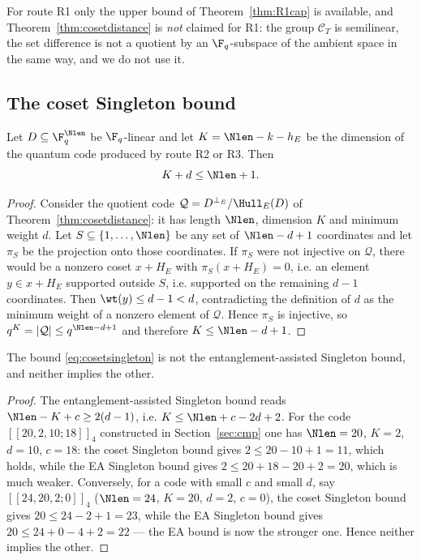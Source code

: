 \begin{remark}
For route R1 only the upper bound of Theorem~\ref{thm:R1cap} is available, and
Theorem~\ref{thm:cosetdistance} is \emph{not} claimed for R1: the group
$\mathcal C_T$ is semilinear, the set difference is not a quotient by an
$\F_q$-subspace of the ambient space in the same way, and we do not use it.
\end{remark}

\subsection{The coset Singleton bound}

\begin{theorem}\label{thm:cosetsingleton}
Let $D\subseteq\F_q^{\Nlen}$ be $\F_q$-linear and let $K=\Nlen-k-h_E$ be the
dimension of the quantum code produced by route R2 or R3. Then
\begin{equation}\label{eq:cosetsingleton}
  K+d\le \Nlen+1 .
\end{equation}
\end{theorem}

\begin{proof}
Consider the quotient code $\mathcal Q=D^{\perp_E}/\Hull_E(D)$ of
Theorem~\ref{thm:cosetdistance}: it has length $\Nlen$, dimension $K$ and
minimum weight $d$. Let $S\subseteq\{1,\dots,\Nlen\}$ be any set of
$\Nlen-d+1$ coordinates and let $\pi_S$ be the projection onto those
coordinates. If $\pi_S$ were not injective on $\mathcal Q$, there would be a
nonzero coset $x+H_E$ with $\pi_S(x+H_E)=0$, i.e. an element
$y\in x+H_E$ supported outside $S$, i.e. supported on the remaining
$d-1$ coordinates. Then $\wt(y)\le d-1<d$, contradicting the definition of $d$
as the minimum weight of a nonzero element of $\mathcal Q$. Hence $\pi_S$ is
injective, so $q^K=|\mathcal Q|\le q^{\Nlen-d+1}$ and therefore
$K\le\Nlen-d+1$.
\end{proof}

\begin{proposition}\label{prop:newsbound}
The bound \eqref{eq:cosetsingleton} is not the entanglement-assisted Singleton
bound, and neither implies the other.
\end{proposition}

\begin{proof}
The entanglement-assisted Singleton bound reads
$\Nlen-K+c\ge 2(d-1)$, i.e. $K\le\Nlen+c-2d+2$. For the code
$[[20,2,10;18]]_4$ constructed in Section~\ref{sec:cmp} one has $\Nlen=20$,
$K=2$, $d=10$, $c=18$: the coset Singleton bound gives $2\le 20-10+1=11$, which
holds, while the EA Singleton bound gives
$2\le 20+18-20+2=20$, which is much weaker. Conversely, for a code with small
$c$ and small $d$, say $[[24,20,2;0]]_4$ ($\Nlen=24$, $K=20$, $d=2$, $c=0$), the
coset Singleton bound gives $20\le 24-2+1=23$, while the EA Singleton bound
gives $20\le 24+0-4+2=22$ --- the EA bound is now the stronger one. Hence
neither implies the other.
\end{proof}

